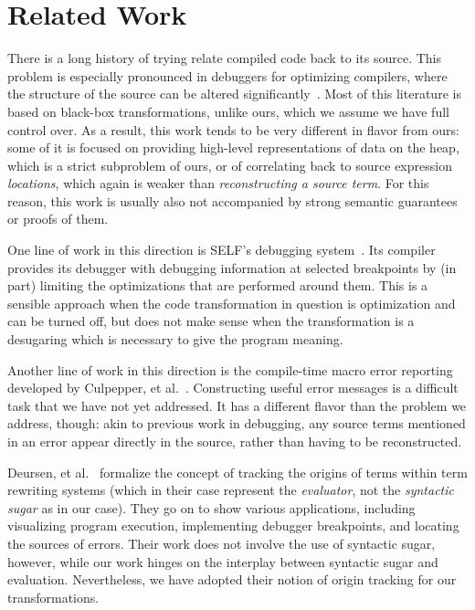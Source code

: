 \section{Related Work}

There is a long history of trying relate compiled code back to its
source. This problem is especially pronounced in debuggers for
optimizing compilers, where the structure of the source can be altered
significantly~\cite{hennessy-debugging}. Most of this literature
is based on black-box
transformations, unlike ours, which we assume we have full control
over.  As a result, this work tends to be very different in flavor
from ours: some of it is focused on providing high-level
representations of data on the heap, which is a strict subproblem of
ours, or of correlating back to source expression \emph{locations}, which
again is weaker than \emph{reconstructing a source term}.
For this reason,
this work is usually also not accompanied by strong semantic
guarantees or proofs of them.

One line of work in this direction is SELF's debugging
system~\cite{self-debugging}. Its compiler provides its debugger with
debugging information at selected breakpoints by (in part) limiting the
optimizations that are performed around them. This is a sensible approach
when the code transformation in question is optimization and can be turned
off, but does not make sense when the transformation is a desugaring
which is necessary to give the program meaning.

Another line of work in this direction is the compile-time macro error
reporting developed by Culpepper, et al.~\cite{fortifying-macros}.
Constructing useful error messages is a difficult task that we have not
yet addressed. It has a different flavor than the problem we address,
though: akin to previous work in debugging, any source terms mentioned in
an error appear directly in the source, rather than having to be
reconstructed.

Deursen, et al.~\cite{deursen:origin-tracking} formalize the concept of
tracking the origins
of terms within term rewriting systems (which in their case represent
the \emph{evaluator}, not the \emph{syntactic sugar} as in our
case). They go on to show various applications, including
visualizing program execution, implementing debugger breakpoints,
and locating the sources of errors.
Their work does not involve the use of syntactic sugar,
however, while our work hinges on the interplay between syntactic
sugar and evaluation. Nevertheless, we
have adopted their notion of origin tracking for our transformations.

